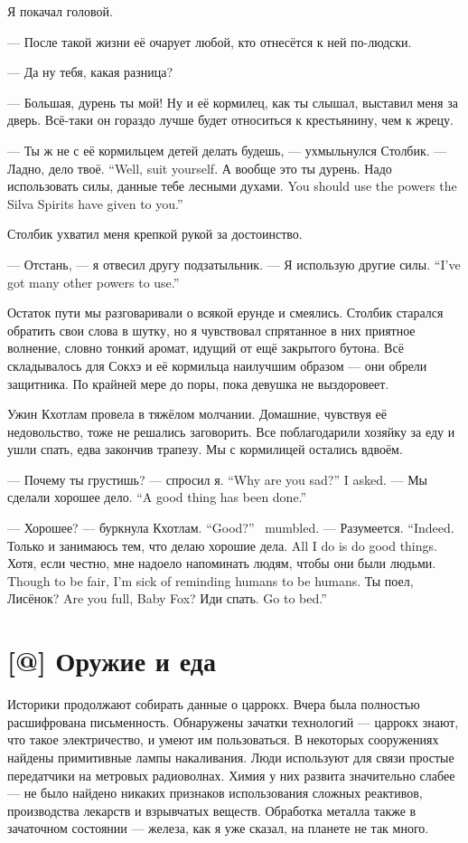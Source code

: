 Я покачал головой.

--- После такой жизни её очарует любой, кто отнесётся к ней по-людски.

--- Да ну тебя, какая разница?

--- Большая, дурень ты мой!
Ну и её кормилец, как ты слышал, выставил меня за дверь.
Всё-таки он гораздо лучше будет относиться к крестьянину, чем к жрецу.

--- Ты ж не с её кормильцем детей делать будешь, --- ухмыльнулся Столбик.
{--- Ладно, дело твоё.}
{``Well, suit yourself.}
А вообще это ты дурень.
{Надо использовать силы, данные тебе лесными духами.}
{You should use the powers the Silva Spirits have given to you.''}

Столбик ухватил меня крепкой рукой за достоинство.

--- Отстань, --- я отвесил другу подзатыльник.
{--- Я использую другие силы.}
{``I've got many other powers to use.''}

Остаток пути мы разговаривали о всякой ерунде и смеялись.
Столбик старался обратить свои слова в шутку, но я чувствовал спрятанное в них приятное волнение, словно тонкий аромат, идущий от ещё закрытого бутона.
Всё складывалось для Сокхэ и её кормильца наилучшим образом --- они обрели защитника.
По крайней мере до поры, пока девушка не выздоровеет.

Ужин Кхотлам провела в тяжёлом молчании.
Домашние, чувствуя её недовольство, тоже не решались заговорить.
Все поблагодарили хозяйку за еду и ушли спать, едва закончив трапезу.
Мы с кормилицей остались вдвоём.

{--- Почему ты грустишь? --- спросил я.}
{``Why are you sad?'' I asked.}
{--- Мы сделали хорошее дело.}
{``A good thing has been done.''}

{--- Хорошее? --- буркнула Кхотлам.}
{``Good?'' \Kchotlam\ mumbled.}
{--- Разумеется.}
{``Indeed.}
{Только и занимаюсь тем, что делаю хорошие дела.}
{All I do is do good things.}
{Хотя, если честно, мне надоело напоминать людям, чтобы они были людьми.}
{Though to be fair, I'm sick of reminding humans to be humans.}
{Ты поел, Лисёнок?}
{Are you full, Baby Fox?}
{Иди спать.}
{Go to bed.''}

\section{[@] Оружие и еда}

Историки продолжают собирать данные о царрокх.
Вчера была полностью расшифрована письменность.
Обнаружены зачатки технологий --- царрокх знают, что такое электричество, и умеют им пользоваться.
В некоторых сооружениях найдены примитивные лампы накаливания.
Люди используют для связи простые передатчики на метровых радиоволнах.
Химия у них развита значительно слабее --- не было найдено никаких признаков использования сложных реактивов, производства лекарств и взрывчатых веществ.
Обработка металла также в зачаточном состоянии --- железа, как я уже сказал, на планете не так много.

